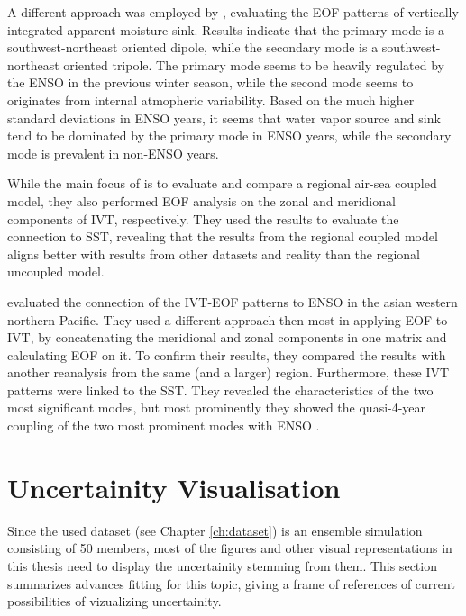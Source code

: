 A different approach was employed by \cite{zou_investigating_2020}, evaluating the EOF patterns of vertically integrated apparent moisture sink. 
Results indicate that the primary mode is a southwest-northeast oriented dipole, while the secondary mode is a southwest-northeast oriented tripole. 
The primary mode seems to be heavily regulated by the ENSO in the previous winter season, while the second mode seems to originates from internal atmopheric variability. 
Based on the much higher standard deviations in ENSO years, it seems that water vapor source and sink tend to be dominated by the primary mode in ENSO years, while the secondary mode is prevalent in non-ENSO years. 


While the main focus of \cite{yao_simulation_2013} is to evaluate and compare a regional air-sea coupled model, they also performed EOF analysis on the zonal and meridional components of IVT, respectively. 
They used the results to evaluate the connection to SST, revealing that the results from the regional coupled model aligns better with results from other datasets and reality than the regional uncoupled model. 


\citeauthor{li_quasi-4-yr_2012} evaluated the connection of the IVT-EOF patterns to ENSO in the asian western northern Pacific.
They used a different approach then most in applying EOF to IVT, by concatenating the meridional and zonal components in one matrix and calculating EOF on it. 
To confirm their results, they compared the results with another reanalysis from the same (and a larger) region. 
Furthermore, these IVT patterns were linked to the SST. 
They revealed the characteristics of the two most significant modes, but most prominently they showed the quasi-4-year coupling of the two most prominent modes with ENSO \cite{li_quasi-4-yr_2012}. 






\section{Uncertainity Visualisation}

Since the used dataset (see Chapter \ref{ch:dataset}) is an ensemble simulation consisting of 50 members, most of the figures and other visual representations in this thesis need to display the uncertainity stemming from them. 
This section summarizes advances fitting for this topic, giving a frame of references of current possibilities of vizualizing uncertainity.

